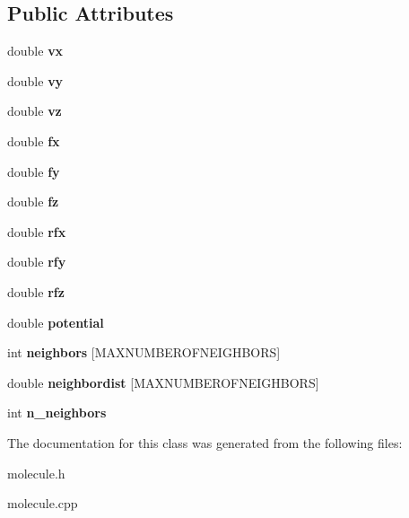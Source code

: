 \subsection*{Public Attributes}
\begin{DoxyCompactItemize}
\item 
\mbox{\label{classCMolecule_adfbd57e11262264d1085003ce6980e0e}} 
double {\bfseries vx}
\item 
\mbox{\label{classCMolecule_a940450fd2115a50185bc25d62d222bfa}} 
double {\bfseries vy}
\item 
\mbox{\label{classCMolecule_a6958f8a29883dcb7c9b95b6d4b672a04}} 
double {\bfseries vz}
\item 
\mbox{\label{classCMolecule_afdf067ddb470fd2abd5bfd51b725421c}} 
double {\bfseries fx}
\item 
\mbox{\label{classCMolecule_ac193b9e1e9a9bba2ac8ec5a92509dc75}} 
double {\bfseries fy}
\item 
\mbox{\label{classCMolecule_a98856c34c33ffbb79dd672f68df7495f}} 
double {\bfseries fz}
\item 
\mbox{\label{classCMolecule_a8b406afe8e1b88c5ad285fbcab5cf4d0}} 
double {\bfseries rfx}
\item 
\mbox{\label{classCMolecule_a3397d14c0de2638847411f990159f817}} 
double {\bfseries rfy}
\item 
\mbox{\label{classCMolecule_a662bb860661423a13952f53bf347ee0a}} 
double {\bfseries rfz}
\item 
\mbox{\label{classCMolecule_ae38677450bdb6d4dacfa739381e30e64}} 
double {\bfseries potential}
\item 
\mbox{\label{classCMolecule_aa243cbc2061911a2c109de89812f30fa}} 
int {\bfseries neighbors} \mbox{[}M\+A\+X\+N\+U\+M\+B\+E\+R\+O\+F\+N\+E\+I\+G\+H\+B\+O\+RS\mbox{]}
\item 
\mbox{\label{classCMolecule_a74bfeb71c972d341abe49625aff07fa8}} 
double {\bfseries neighbordist} \mbox{[}M\+A\+X\+N\+U\+M\+B\+E\+R\+O\+F\+N\+E\+I\+G\+H\+B\+O\+RS\mbox{]}
\item 
\mbox{\label{classCMolecule_a367a1ece8a50fa7d190bfe9178bde256}} 
int {\bfseries n\+\_\+neighbors}
\end{DoxyCompactItemize}


The documentation for this class was generated from the following files\+:\begin{DoxyCompactItemize}
\item 
molecule.\+h\item 
molecule.\+cpp\end{DoxyCompactItemize}

